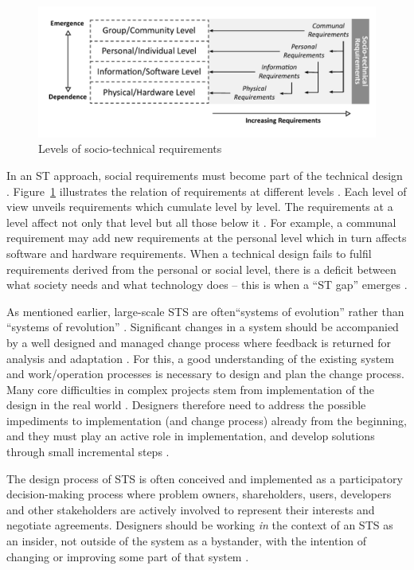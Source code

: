 %
%
\begin{figure}[b!]
\centering
\includegraphics[width=.82\linewidth]{img/sts_requirements.pdf}
\caption{Levels of socio-technical requirements \cite{Whitworth2009a}}
\label{fig:sts_requirements} 
\end{figure}
% 
%
In an ST approach, social requirements must become part of the technical design \cite{Whitworth2014}. Figure~\ref{fig:sts_requirements} illustrates the relation of requirements at different levels \cite{Whitworth2009a}. Each level of view unveils requirements which cumulate level by level. The requirements at a level affect not only that level but all those below it \cite{Whitworth2009a}. For example, a communal requirement may add new requirements at the personal level which in turn affects software and hardware requirements. When a technical design fails to fulfil requirements derived from the personal or social level, there is a deficit  between  what  society  needs  and  what technology does -- this is when a ``ST  gap''  emerges \cite{Whitworth2014}. 


As mentioned earlier, large-scale STS are often``systems of evolution'' rather than ``systems of revolution'' \cite{Baxter2011,Norman2015}. Significant changes in a system should be accompanied by a well designed and managed change process where feedback is returned for analysis and adaptation \cite{Baxter2011}. For this, a good understanding of the existing system and work/operation processes is necessary to design and plan the change process. Many core difficulties in complex projects stem from implementation of the design in the real world \cite{Norman2015}. Designers therefore need to address the possible impediments to implementation (and change process) already from the beginning, and they must play an active role in implementation, and develop solutions through small incremental steps \cite{Norman2015}.

 The design process of STS is often conceived and implemented as a participatory decision-making process where problem owners, shareholders, users, developers and other stakeholders are actively involved to represent their interests and negotiate agreements. 
Designers should be working \textit{in} the context of an STS as an insider, not outside of the system as a bystander, with the intention of changing or improving some part of that system \cite{Bots2007}. 

